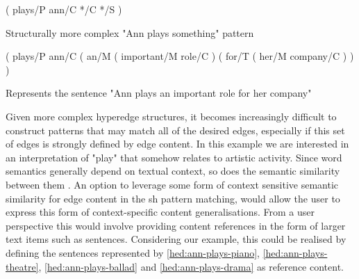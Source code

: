\documentclass[11pt, numbers=noenddot]{scrreprt}
\let\cite\parencite  %
\begin{document}
\begin{pattern}[h!]
  \normalfont\sffamily
  \centering
  ( plays/P ann/C */C */S )
  \caption{Structurally more complex "Ann plays something" pattern}
  \label{pat:ann-plays-something-complex}
\end{pattern}
  
\begin{hedge}[h!]
  \normalfont\sffamily
  \centering
( plays/P ann/C ( an/M ( important/M role/C ) ( for/T ( her/M company/C ) ) )
  \caption{Represents the sentence "Ann plays an important role for her company"}
  \label{hed:ann-plays-company}
\end{hedge}

Given more complex hyperedge structures, it becomes increasingly difficult to construct patterns that may match all of the desired edges, especially if this set of edges is strongly defined by edge content. In this example we are interested in an interpretation of "play" that somehow relates to artistic activity. Since word semantics generally depend on textual context, so does the semantic similarity between them \cite[Section 2.2.3]{harispeSemanticSimilarityNatural2015}. An option to leverage some form of context sensitive semantic similarity for edge content in the \gls{sh} pattern matching, would allow the user to express this form of context-specific content generalisations. From a user perspective this would involve providing content references in the form of larger text items such as sentences. Considering our example, this could be realised by defining the sentences represented by \cref{hed:ann-plays-piano}, \cref{hed:ann-plays-theatre}, \cref{hed:ann-plays-ballad} and \cref{hed:ann-plays-drama} as reference content.

\end{document}
